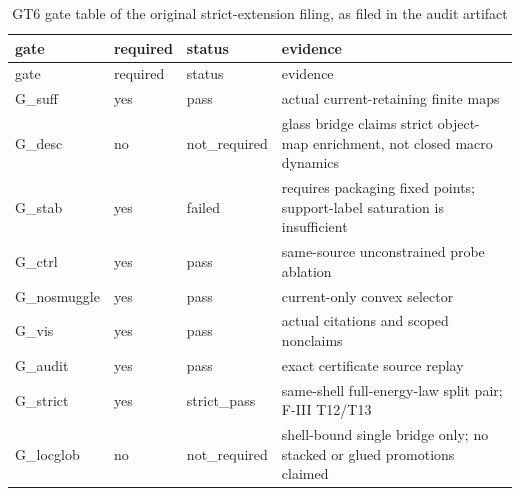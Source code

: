 \begin{longtable}{lllp{6.5cm}}
\caption{GT6 gate table of the original strict-extension filing, as filed in the audit artifact}\label{tab:gt6-gate-table} \\
\toprule
gate & required & status & evidence \\
\midrule
\endfirsthead
\toprule
gate & required & status & evidence \\
\midrule
\endhead
\bottomrule
\endfoot
G\_suff & yes & pass & actual current-retaining finite maps \\
G\_desc & no & not\_required & glass bridge claims strict object-map enrichment, not closed macro dynamics \\
G\_stab & yes & failed & requires packaging fixed points; support-label saturation is insufficient \\
G\_ctrl & yes & pass & same-source unconstrained probe ablation \\
G\_nosmuggle & yes & pass & current-only convex selector \\
G\_vis & yes & pass & actual citations and scoped nonclaims \\
G\_audit & yes & pass & exact certificate source replay \\
G\_strict & yes & strict\_pass & same-shell full-energy-law split pair; F-III T12/T13 \\
G\_locglob & no & not\_required & shell-bound single bridge only; no stacked or glued promotions claimed \\
\bottomrule
\end{longtable}
